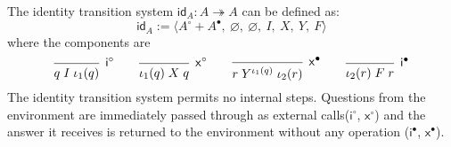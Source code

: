 \documentclass[sigplan,10pt,review,anonymous]{acmart}
\newcommand{\kw}[1]{\ensuremath{\mathsf{#1}}}
\begin{document}
\begin{definition} \label{def:lts-id}

The identity transition system $\mathsf{id}_A : A \twoheadrightarrow A$ can be
defined as:
\[
  \mathsf{id}_A :=
  \langle A^\circ + A^\bullet,\: \varnothing,\: \varnothing,\: I,\: X,\: Y,\: F \rangle
\]
where the components are
\[
  \begin{prooftree}
    \infer0[$\kw{i}^\circ$]{q \mathrel{I} \iota_1(q)}
  \end{prooftree}
  \qquad
  \begin{prooftree}
    \infer0[$\kw{x}^\circ$]{\iota_1(q) \mathrel{X} q}
  \end{prooftree}
  \qquad
  \begin{prooftree}
    \infer0[$\kw{x}^\bullet$]{r \mathrel{Y^{\iota_1(q)}} \iota_2(r)}
  \end{prooftree}
  \qquad
  \begin{prooftree}
    \infer0[$\kw{i}^\bullet$]{\iota_2(r) \mathrel{F} r}
  \end{prooftree}
\]
The identity transition system permits no internal steps. Questions from the
environment are immediately passed through as external calls($\kw{i}^\circ$,
$\kw{x}^\circ$) and the answer it receives is returned to the environment
without any operation ($\kw{i}^\bullet$, $\kw{x}^\bullet$).

\end{definition}
\end{document}
